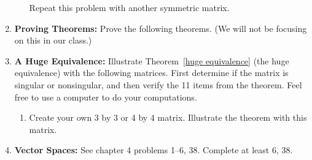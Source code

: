 \begin{enumerate}
\begin{enumerate}
	Repeat this problem with another symmetric matrix. 
\end{enumerate}













\item \textbf{Proving Theorems:} Prove the following theorems. (We will not be focusing on this in our class.)












\item \textbf{A Huge Equivalence:}  
Illustrate Theorem~\ref{huge equivalence} \label{equivalence problems} (the huge equivalence) with the following matrices.  First determine if the matrix is singular or nonsingular, and then verify the 11 items from the theorem. Feel free to use a computer to do your computations.
\begin{enumerate}
	\item Create your own 3 by 3 or 4 by 4 matrix. Illustrate the theorem with this matrix.
\end{enumerate}




\item \textbf{Vector Spaces:}  \label{vector space problems}
See chapter 4 problems 1--6, 38. Complete at least 6, 38. 



\end{enumerate}
